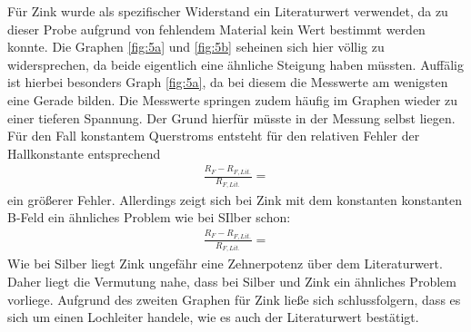 Für Zink wurde als spezifischer Widerstand ein Literaturwert verwendet, da zu dieser
Probe aufgrund von fehlendem Material kein Wert bestimmt werden konnte.
Die Graphen \ref{fig:5a} und \ref{fig:5b} seheinen sich hier völlig zu widersprechen, da
beide eigentlich eine ähnliche Steigung haben müssten. Auffälig ist hierbei besonders
Graph \ref{fig:5a}, da bei diesem die Messwerte am wenigsten eine Gerade bilden. Die
Messwerte springen zudem häufig im Graphen wieder zu einer tieferen Spannung.
Der Grund hierfür müsste in der Messung selbst liegen.
Für den Fall konstantem Querstroms entsteht für den relativen Fehler der Hallkonstante
entsprechend
\begin{align}
    \frac{R_F - R_{F,Lit.}}{R_{F,Lit.}} = \text{}
\end{align}
ein größerer Fehler.
Allerdings zeigt sich bei Zink mit dem konstanten konstanten B-Feld ein ähnliches Problem
wie bei SIlber schon:
\begin{align}
    \frac{R_F - R_{F,Lit.}}{R_{F,Lit.}} = \text{}
\end{align}
Wie bei Silber liegt Zink ungefähr eine Zehnerpotenz über dem Literaturwert. Daher
liegt die Vermutung nahe, dass bei Silber und Zink ein ähnliches Problem vorliege.
Aufgrund des zweiten Graphen für Zink ließe sich schlussfolgern, dass es sich um einen
Lochleiter handele, wie es auch der Literaturwert bestätigt.

\newpage
\printbibliography

